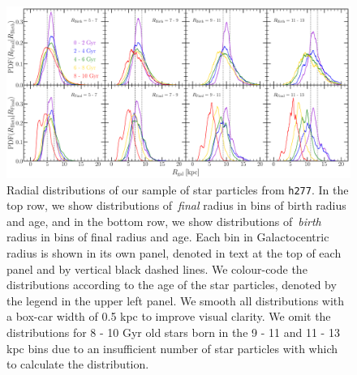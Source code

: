 \begin{figure} 
\centering 
\includegraphics[scale = 0.32]{decomposition.pdf} 
\caption{Radial distributions of our sample of star particles from 
\texttt{h277}. In the top row, we show distributions of~\textit{final} radius 
in bins of birth radius and age, and in the bottom row, we show distributions 
of~\textit{birth} radius in bins of final radius and age. Each bin in 
Galactocentric radius is shown in its own panel, denoted in text at the top of 
each panel and by vertical black dashed lines. We colour-code the distributions 
according to the age of the star particles, denoted by the legend in the upper 
left panel. We smooth all distributions with a box-car width of 0.5 kpc to 
improve visual clarity. We omit the distributions for 8 - 10 Gyr old stars born 
in the 9 - 11 and 11 - 13 kpc bins due to an insufficient number of star 
particles with which to calculate the distribution. } 
\label{migration:fig:h277_decomposition} 
\end{figure} 

